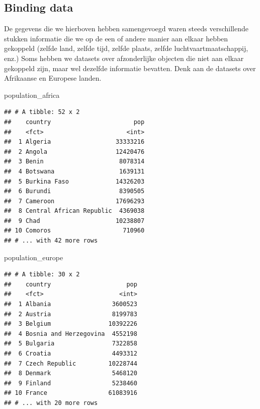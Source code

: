 \documentclass[]{tufte-book}
\newenvironment{Shaded}{}{}
\newcommand{\NormalTok}[1]{#1}
\begin{document}
\hypertarget{binding-data}{%
\subsection{Binding data}\label{binding-data}}

De gegevens die we hierboven hebben samengevoegd waren steeds verschillende stukken informatie die we op de een of andere manier aan elkaar hebben gekoppeld (zelfde land, zelfde tijd, zelfde plaats, zelfde luchtvaartmaatschappij, enz.) Soms hebben we datasets over afzonderlijke objecten die niet aan elkaar gekoppeld zijn, maar wel dezelfde informatie bevatten. Denk aan de datasets over Afrikaanse en Europese landen.

\begin{Shaded}
\begin{Highlighting}[]
\NormalTok{population_africa}
\end{Highlighting}
\end{Shaded}

\begin{verbatim}
## # A tibble: 52 x 2
##    country                       pop
##    <fct>                       <int>
##  1 Algeria                  33333216
##  2 Angola                   12420476
##  3 Benin                     8078314
##  4 Botswana                  1639131
##  5 Burkina Faso             14326203
##  6 Burundi                   8390505
##  7 Cameroon                 17696293
##  8 Central African Republic  4369038
##  9 Chad                     10238807
## 10 Comoros                    710960
## # ... with 42 more rows
\end{verbatim}

\begin{Shaded}
\begin{Highlighting}[]
\NormalTok{population_europe}
\end{Highlighting}
\end{Shaded}

\begin{verbatim}
## # A tibble: 30 x 2
##    country                     pop
##    <fct>                     <int>
##  1 Albania                 3600523
##  2 Austria                 8199783
##  3 Belgium                10392226
##  4 Bosnia and Herzegovina  4552198
##  5 Bulgaria                7322858
##  6 Croatia                 4493312
##  7 Czech Republic         10228744
##  8 Denmark                 5468120
##  9 Finland                 5238460
## 10 France                 61083916
## # ... with 20 more rows
\end{verbatim}
\end{document}

